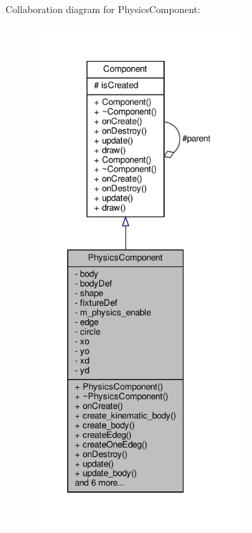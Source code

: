 Collaboration diagram for Physics\+Component\+:
\nopagebreak
\begin{figure}[H]
\begin{center}
\leavevmode
\includegraphics[height=550pt]{classPhysicsComponent__coll__graph}
\end{center}
\end{figure}
